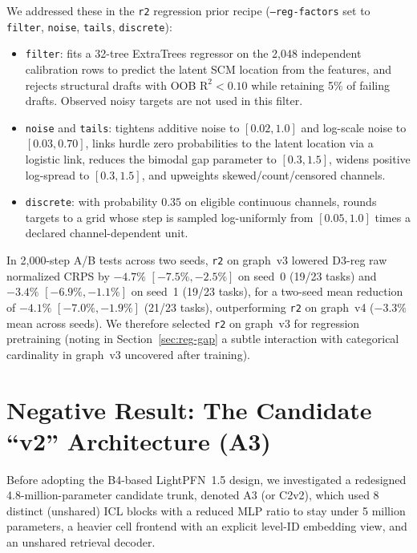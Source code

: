 \documentclass[11pt]{article}
\begin{document}
We addressed these in the \texttt{r2} regression prior recipe (\texttt{--reg-factors} set to \texttt{filter}, \texttt{noise}, \texttt{tails}, \texttt{discrete}): %
\begin{itemize}
\item \texttt{filter}: fits a 32-tree ExtraTrees regressor on the 2,048 independent calibration rows to predict the latent SCM location from the features, and rejects structural drafts with OOB $\mathrm{R}^2<0.10$ while retaining 5\% of failing drafts. Observed noisy targets are not used in this filter. %
\item \texttt{noise} and \texttt{tails}: tightens additive noise to $[0.02, 1.0]$ and log-scale noise to $[0.03, 0.70]$, links hurdle zero probabilities to the latent location via a logistic link, reduces the bimodal gap parameter to $[0.3,1.5]$, widens positive log-spread to $[0.3, 1.5]$, and upweights skewed/count/censored channels.
\item \texttt{discrete}: with probability $0.35$ on eligible continuous channels, rounds targets to a grid whose step is sampled log-uniformly from $[0.05,1.0]$ times a declared channel-dependent unit. %
\end{itemize}
In 2,000-step A/B tests across two seeds, \texttt{r2} on graph~v3 lowered D3-reg raw normalized CRPS by $-4.7\%$ $[-7.5\%, -2.5\%]$ on seed~0 (19/23 tasks) and $-3.4\%$ $[-6.9\%, -1.1\%]$ on seed~1 (19/23 tasks), for a two-seed mean reduction of $-4.1\%$ $[-7.0\%, -1.9\%]$ (21/23 tasks), outperforming \texttt{r2} on graph~v4 ($-3.3\%$ mean across seeds). %
We therefore selected \texttt{r2} on graph~v3 for regression pretraining (noting in Section~\ref{sec:reg-gap} a subtle interaction with categorical cardinality in graph~v3 uncovered after training).

\section{Negative Result: The Candidate ``v2'' Architecture (A3)}
\label{sec:negative}

Before adopting the B4-based LightPFN~1.5 design, we investigated a redesigned 4.8-million-parameter candidate trunk, denoted A3 (or C2v2), which used 8 distinct (unshared) ICL blocks with a reduced MLP ratio to stay under 5 million parameters, a heavier cell frontend with an explicit level-ID embedding view, and an unshared retrieval decoder. %
\end{document}
